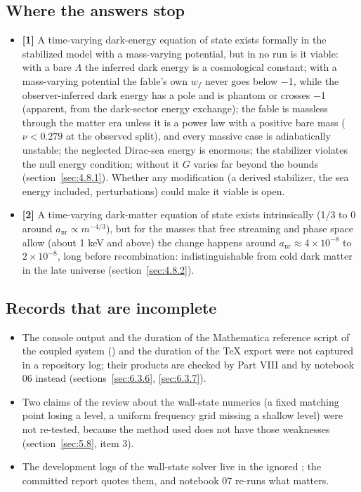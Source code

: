 \subsection{Where the answers stop}
\label{sec:8.3}

\begin{itemize}
  \item \textbf{[1]} A time-varying dark-energy equation of state exists formally in the stabilized model with a mass-varying potential, but in no run is it viable: with a bare $\Lambda$ the inferred dark energy is a cosmological constant; with a mass-varying potential the fable's own $w_f$ never goes below \ensuremath{-}1, while the observer-inferred dark energy has a pole and is phantom or crosses \ensuremath{-}1 (apparent, from the dark-sector energy exchange); the fable is massless through the matter era unless it is a power law with a positive bare mass ($\nu < 0.279$ at the observed split), and every massive case is adiabatically unstable; the neglected Dirac-sea energy is enormous; the stabilizer violates the null energy condition; without it $G$ varies far beyond the bounds (section~\ref{sec:4.8.1}). Whether any modification (a derived stabilizer, the sea energy included, perturbations) could make it viable is open.
  \item \textbf{[2]} A time-varying dark-matter equation of state exists intrinsically (1/3 to 0 around $a_{\mathrm{nr}} \propto m^{-4/3}$), but for the masses that free streaming and phase space allow (about 1 keV and above) the change happens around $a_{\mathrm{nr}} \approx 4\times10^{-8}$ to $2\times10^{-8}$, long before recombination: indistinguishable from cold dark matter in the late universe (section~\ref{sec:4.8.2}).
\end{itemize}

\subsection{Records that are incomplete}
\label{sec:8.4}

\begin{itemize}
  \item The console output and the duration of the Mathematica reference script of the coupled system () and the duration of the TeX export were not captured in a repository log; their products are checked by Part VIII and by notebook 06 instead (sections~\ref{sec:6.3.6}, \ref{sec:6.3.7}).
  \item Two claims of the review about the wall-state numerics (a fixed matching point losing a level, a uniform frequency grid missing a shallow level) were not re-tested, because the method used does not have those weaknesses (section~\ref{sec:5.8}, item 3).
  \item The development logs of the wall-state solver live in the ignored ; the committed report quotes them, and notebook 07 re-runs what matters.
\end{itemize}

